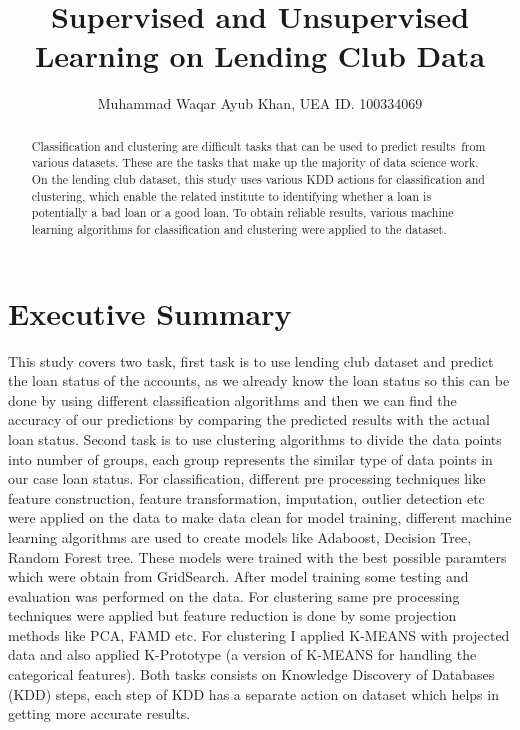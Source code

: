 \documentclass[12pt]{article}
\title{Supervised and Unsupervised Learning on Lending Club Data}
\author{Muhammad Waqar Ayub Khan, UEA ID. 100334069}
\begin{document}
\maketitle

\begin{abstract}
	
\onehalfspacing

Classification and clustering are difficult tasks that can be used to predict results from various datasets. These are the tasks that make up the majority of data science work. On the lending club dataset, this study uses various KDD actions for classification and clustering, which enable the related institute to identifying whether a loan is potentially a bad loan or a good loan. To obtain reliable results, various machine learning algorithms for classification and clustering were applied to the dataset.

\end{abstract}


\section{Executive Summary}
This study covers two task, first task is to use lending club dataset and predict the loan status of the accounts, as we already know the loan status so this can be done by using different classification algorithms and then we can find the accuracy of our predictions by comparing the predicted results with the actual loan status. Second task is to use clustering algorithms to divide the data points into number of groups, each group represents the similar type of data points in our case loan status. For classification, different pre processing techniques like feature construction, feature transformation, imputation, outlier detection etc were applied on the data to make data clean for model training, different machine learning algorithms are used to create models like Adaboost, Decision Tree, Random Forest tree. These models were trained with the best possible paramters which were obtain from GridSearch. After model training some testing and evaluation was performed on the data. For clustering same pre processing techniques were applied but feature reduction is done by some projection methods like PCA, FAMD etc. For clustering I applied K-MEANS with projected data and also applied K-Prototype (a version of K-MEANS for handling the categorical features). Both tasks consists on Knowledge Discovery of Databases (KDD) steps, each step of KDD has a separate action on dataset which helps in getting more accurate results. 
\end{document}
